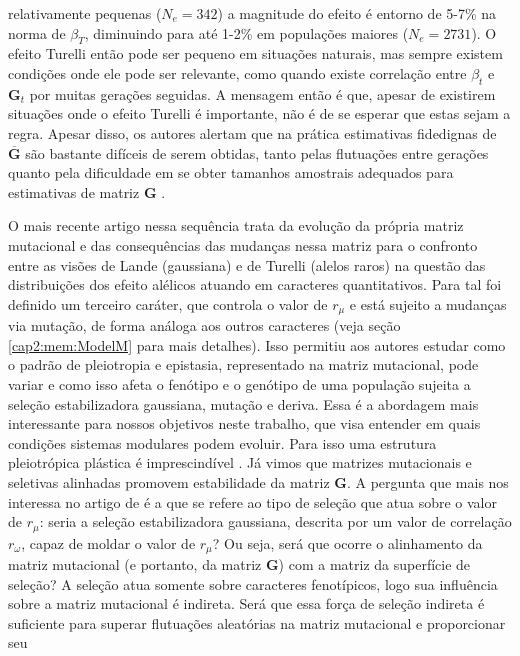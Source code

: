relativamente pequenas ($N_e=342$) a magnitude do efeito é entorno de
5-7\% na norma de $\beta_T$, diminuindo para até 1-2\% em populações
maiores ($N_e=2731$).
O efeito Turelli então pode ser pequeno em situações naturais, mas
sempre existem condições onde ele pode ser relevante, como quando existe
correlação entre $\beta_t$ e $\mathbf{G}_t$ por muitas gerações seguidas.
A mensagem então é que, apesar de existirem situações onde o efeito
Turelli é importante, não é de se esperar que estas sejam a regra.
Apesar disso, os autores alertam que na prática estimativas fidedignas
de $\overline {\mathbf{G}}$ são bastante difíceis de serem obtidas, tanto pelas
flutuações entre gerações quanto pela dificuldade em se obter tamanhos
amostrais adequados para estimativas de matriz $\mathbf{G}$ \citep{Marroig2012}.

O mais recente artigo nessa sequência \citep{Jones2007} trata da
evolução da própria matriz mutacional e das consequências das mudanças
nessa matriz para o confronto entre as visões de Lande (gaussiana) e de
Turelli (alelos raros) na questão das distribuições dos efeito alélicos
atuando em caracteres quantitativos.
Para tal foi definido um terceiro caráter, que controla o valor de
$r_\mu$ e está sujeito a mudanças via mutação, de forma análoga aos
outros caracteres (veja seção \ref{cap2:mem:ModelM} para mais detalhes).
Isso permitiu aos autores estudar como o padrão de pleiotropia e
epistasia, representado na matriz mutacional, pode variar e como isso
afeta o fenótipo e o genótipo de uma população sujeita a seleção
estabilizadora gaussiana, mutação e deriva.
Essa é a abordagem mais interessante para nossos objetivos neste
trabalho, que visa entender em quais condições sistemas modulares podem
evoluir.
Para isso uma estrutura pleiotrópica plástica é imprescindível
\citep{Wagner1996, Pavlicev2011a}.
Já vimos que matrizes mutacionais e seletivas alinhadas promovem
estabilidade da matriz $\mathbf{G}$.
A pergunta que mais nos interessa no artigo de \cite{Jones2007} é a que
se refere ao tipo de seleção que atua sobre o valor de $r_\mu$: seria a
seleção estabilizadora gaussiana, descrita por um valor de correlação
$r_\omega$, capaz de moldar o valor de $r_\mu$? 
Ou seja, será que ocorre o alinhamento da matriz mutacional (e portanto,
da matriz $\mathbf{G}$)  com a matriz da superfície de seleção? 
A seleção atua somente sobre caracteres fenotípicos, logo sua influência
sobre a matriz mutacional é indireta.
Será que essa força de seleção indireta é suficiente para superar
flutuações aleatórias na matriz mutacional e proporcionar seu
